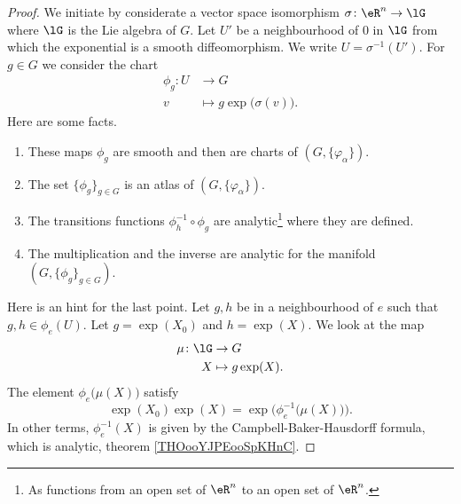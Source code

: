 \begin{proof}
    We initiate by considerate a vector space isomorphism \( \sigma\colon \eR^n\to \lG\) where \( \lG\) is the Lie algebra of \( G\). Let \( U'\) be a neighbourhood of \( 0\) in \( \lG\) from which the exponential is a smooth diffeomorphism. We write \( U=\sigma^{-1}(U')\). For \( g\in G\) we consider the chart
    \begin{equation}
        \begin{aligned}
            \phi_g\colon U&\to G \\
            v&\mapsto g\exp\big( \sigma(v) \big). 
        \end{aligned}
    \end{equation}
    Here are some facts.
    \begin{enumerate}
        \item
            These maps \( \phi_g\) are smooth and then are charts of \( (G,\{ \varphi_{\alpha} \})\).
        \item
            The set \( \{ \phi_g \}_{g\in G}\) is an atlas of \( (G,\{ \varphi_{\alpha} \})\).
        \item
            The transitions functions \( \phi_h^{-1}\circ\phi_g\) are analytic\footnote{As functions from an open set of \( \eR^n\) to an open set of \( \eR^n\).} where they are defined.
        \item
            The multiplication and the inverse are analytic for the manifold \( (G,\{ \phi_g \}_{g\in G})\).
    \end{enumerate}
    Here is an hint for the last point. Let \( g,h\) be in a neighbourhood of \( e\) such that \( g,h\in \phi_e(U)\). Let \( g=\exp(X_0)\) and \( h=\exp(X)\). We look at the map
    \begin{equation}
        \begin{aligned}
            \mu\colon \lG&\to G \\
            X&\mapsto g\exp(X). 
        \end{aligned}
    \end{equation}
    The element \( \phi_e\big( \mu(X) \big)\) satisfy
    \begin{equation}
        \exp(X_0)\exp(X)=\exp\Big( \phi_e^{-1}\big( \mu(X) \big) \Big).
    \end{equation}
    In other terms, \( \phi_e^{-1}(X)\) is given by the Campbell-Baker-Hausdorff formula, which is analytic, theorem \ref{THOooYJPEooSpKHnC}.
\end{proof}

